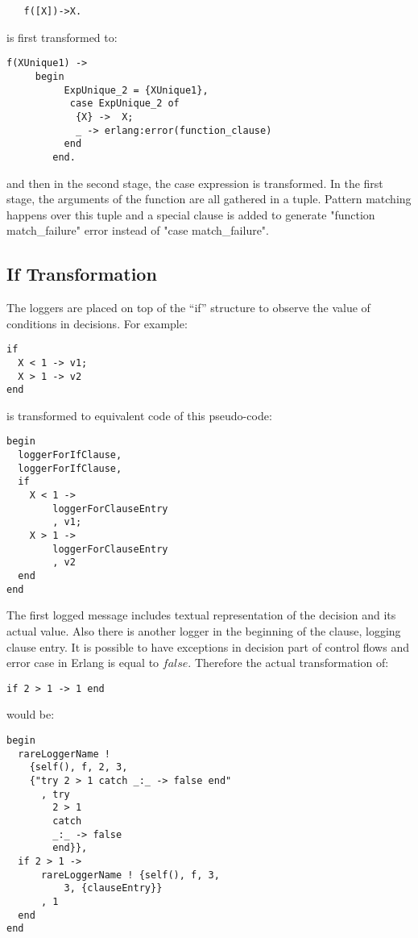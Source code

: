 \documentclass[12pt,a4paper]{report}
\begin{document}
\begin{lstlisting}
   f([X])->X.
\end{lstlisting}

is first transformed to:

\begin{lstlisting}
f(XUnique1) ->
     begin
          ExpUnique_2 = {XUnique1},
           case ExpUnique_2 of
            {X} ->  X;
            _ -> erlang:error(function_clause)
          end
        end.
\end{lstlisting}

and then in the second stage, the case expression is transformed. In the first stage, the arguments of the function are all gathered in a tuple. Pattern matching happens over
 this tuple and a special clause is added to generate "function match\_failure" error instead of "case match\_failure".

\subsection{If Transformation}
The loggers are placed on top of the “if” structure to observe the value of conditions in decisions. For example:

\begin{lstlisting}
if 
  X < 1 -> v1;
  X > 1 -> v2
end 
\end{lstlisting}

is transformed to equivalent code of this pseudo-code:

\begin{lstlisting}
begin
  loggerForIfClause,
  loggerForIfClause,  
  if 
    X < 1 ->
	    loggerForClauseEntry
	    , v1;
    X > 1 ->
	    loggerForClauseEntry
	    , v2
  end
end 
\end{lstlisting}

The first logged message includes textual representation of the decision and its actual value. Also there is another logger in the beginning of the clause, logging clause entry.
 It is possible to have exceptions in decision part of control flows and error case in Erlang is equal to $false$. Therefore the actual transformation of:

\begin{lstlisting}
if 2 > 1 -> 1 end
\end{lstlisting}

would be:

\begin{lstlisting}
begin
  rareLoggerName !
    {self(), f, 2, 3,
	{"try 2 > 1 catch _:_ -> false end"
	  , try 	
		2 > 1 
	    catch 
		_:_ -> false 
	    end}},
  if 2 > 1 ->
      rareLoggerName ! {self(), f, 3,
	      3, {clauseEntry}}
      , 1
  end
end 
\end{lstlisting}
\end{document}
